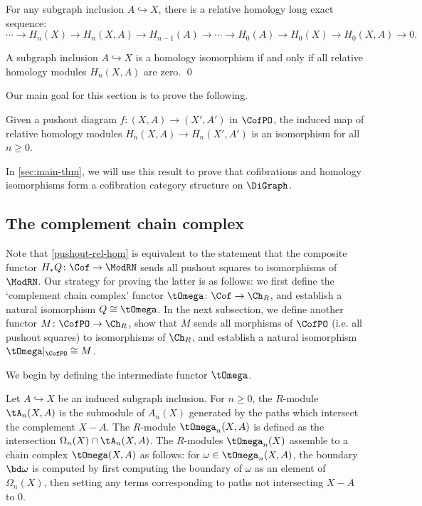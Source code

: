 \begin{proposition}\label{rhom-les}
For any subgraph inclusion $A \hookrightarrow X$, there is a relative homology long exact sequence:
\[
\cdots \to H_n(X) \to H_{n}(X,A) \to H_{n-1}(A) \to \cdots \to H_0(A) \to H_0(X) \to H_0(X,A) \to 0\text{.}
\]
\end{proposition}

\begin{corollary}\label{tcof-rel-hom}
A subgraph inclusion $A \hookrightarrow X$ is a homology isomorphism if and only if all relative homology modules $H_n(X,A)$ are zero. \qed
\end{corollary}

Our main goal for this section is to prove the following.

\begin{theorem}\label{pushout-rel-hom}
Given a pushout diagram $f \colon (X,A) \to (X',A')$ in $\CofPO$,
the induced map of relative homology modules $H_n(X,A) \to H_n(X',A')$ is an isomorphism for all $n \geq 0$.
\end{theorem}

In \cref{sec:main-thm}, we will use this result to prove that cofibrations and homology isomorphisms form a cofibration category structure on $\DiGraph$.

\subsection{The complement chain complex}

Note that \cref{pushout-rel-hom} is equivalent to the statement that the composite functor $H_* Q \colon \Cof \to \ModRN$ sends all pushout squares to isomorphisms of $\ModRN$. Our strategy for proving the latter is as follows: we first define the `complement chain complex' functor $\tOmega \colon \Cof \to \Ch_R$, and establish a natural isomorphism $Q \cong \tOmega$.
In the next subsection, we define another functor $M \colon \CofPO \to \Ch_R$, show that $M$ sends all morphisms of $\CofPO$ (i.e.  all pushout squares) to isomorphisms of $\Ch_R$, and establish a natural isomorphism $\tOmega|_{\CofPO} \cong M$.

We begin by defining the intermediate functor $\tOmega$.

\begin{defi}
Let $A \hookrightarrow X$ be an induced subgraph inclusion. For $n \geq 0$, the $R$-module  $\tA_n(X,A)$ is the submodule of $A_n(X)$ generated by the paths which intersect the complement $X - A$. The $R$-module $\tOmega_n(X,A)$ is defined as the intersection $\Omega_n(X) \cap \tA_n(X,A)$. The $R$-modules $\tOmega_n(X)$ assemble to a chain complex $\tOmega(X,A)$ as follows:  for $\omega \in \tOmega_n(X,A)$, the boundary $\bd \omega$ is computed by first computing the boundary of $\omega$ as an element of $\Omega_n(X)$, then setting any terms corresponding to paths not intersecting $X - A$ to $0$.
\end{defi}

